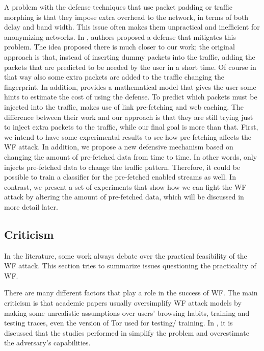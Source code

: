 A problem with the defense techniques that use packet padding or traffic morphing is that they impose extra
 overhead to the network, in terms of both delay and band width. This issue often makes them unpractical and inefficient for anonymizing networks. In \cite{yu10}, authors proposed a defense that mitigates this problem. 
 The idea proposed there is much closer to our work; the original approach is that, instead of inserting dummy packets into the traffic, adding the packets that are predicted to be needed by the user in a short time. Of course in that way also some extra packets are added to the traffic changing the fingerprint. In addition,  \cite{yu10} provides a mathematical model that gives the user some hints to estimate the cost of using the defense. To predict which packets must be injected into the traffic, \cite{yu10}
 makes use of link pre-fetching and web caching. The difference between their work and our approach is that they are still trying just to inject extra packets to the traffic, while our final goal is more than that. First, we intend 
 to have some experimental results to see how pre-fetching affects the WF attack. In addition, we propose a new defensive mechanism based on changing the amount of pre-fetched data from time to time. In other words, \cite{yu10} only injects pre-fetched data to change the traffic pattern. Therefore, it could be possible to train a classifier for the pre-fetched enabled streams as well. In contrast, we present a set of experiments that show how we can fight the WF attack by altering the amount of pre-fetched data, which will be discussed in more detail later.
 
 
\subsection{Criticism}

In the literature, some work always debate over the practical feasibility of the WF attack. This section tries to summarize issues questioning the practicality of WF.

There are many different factors that play a role in the success of WF.
The main criticism is that academic papers usually oversimplify WF attack models by making some unrealistic assumptions over users' browsing habits, training and testing traces, even the version of Tor used for testing/ training.
In \cite{juarez14}, it is discussed that the studies performed in \cite{cai2012touching, herrmann2009, panchenko11, wang2013improved, shi2009} simplify the problem and overestimate the adversary's capabilities.

